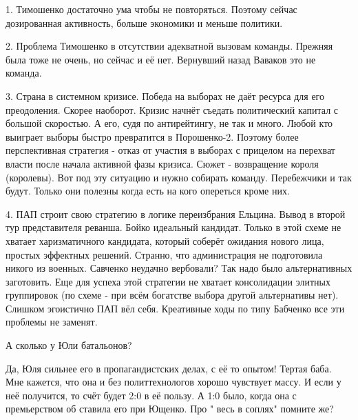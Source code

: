 \begin{itemize}
1. Тимошенко достаточно ума чтобы не повторяться. Поэтому сейчас дозированная
активность, больше экономики и меньше политики. 

2. Проблема Тимошенко в отсутствии адекватной вызовам команды. Прежняя была
тоже не очень, но сейчас и её нет. Вернувший назад Ваваков это не команда. 

3. Страна в системном кризисе.  Победа на выборах не даёт ресурса для его
преодоления. Скорее наоборот. Кризис начнёт съедать политический капитал с
большой скоростью. А его, судя по антирейтингу, не так и много. Любой кто
выиграет выборы быстро превратится в Порошенко-2. Поэтому более перспективная
стратегия - отказ от участия в выборах с прицелом на перехват власти после
начала активной фазы кризиса. Сюжет - возвращение короля (королевы). Вот под
эту ситуацию и нужно собирать команду.  Перебежчики и так будут. Только они
полезны когда есть на кого опереться кроме них. 

4. ПАП строит свою стратегию в логике переизбрания Ельцина. Вывод в второй тур
представителя реванша. Бойко идеальный кандидат. Только в этой схеме не хватает
харизматичного кандидата, который соберёт ожидания нового лица, простых
эффектных решений. Странно, что администрация не подготовила никого из военных.
Савченко неудачно вербовали? Так надо было альтернативных заготовить. Еще для
успеха этой стратегии не хватает консолидации элитных группировок (по схеме -
при всём богатстве выбора другой альтернативы нет). Слишком эгоистично ПАП вёл
себя. Креативные ходы по типу Бабченко все эти проблемы не заменят.

А сколько у Юли батальонов?


Да, Юля сильнее его в пропагандистских делах, с её то опытом! Тертая баба. Мне
кажется, что она и без политтехнологов хорошо чувствует массу. И если у неё
получится, то счёт будет 2:0 в её пользу. А 1:0 было, когда она с премьерством об
ставила его при Ющенко. Про " весь в соплях" помните же?

\end{itemize} %
